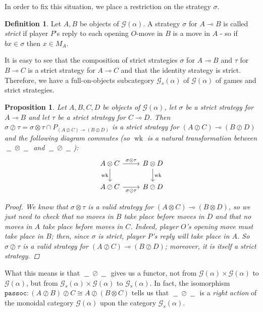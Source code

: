 \documentclass[11pt]{article} %
\theoremstyle{plain} %
\newtheorem{proposition}[theorem]{Proposition}
\theoremstyle{definition} %
\newtheorem{definition}[theorem]{Definition}
\theoremstyle{note}
\theoremstyle{exercisestyle}
\newcommand*\from{\colon}
\newcommand{\tensor}{\otimes}
\newcommand{\sequoid}{\oslash}
\renewcommand{\implies}{\multimap}
\newcommand{\G}{\mathcal G}
\newcommand{\blank}{\;\underline{\hspace{1.5ex}}\;}
\DeclareMathOperator{\wk}{wk}
\newcommand{\passoc}{{\texttt{passoc}}}
\begin{document}
In order to fix this situation, we place a restriction on the strategy $\sigma$.

\begin{definition}
  Let $A,B$ be objects of $\G(\alpha)$.  A strategy $\sigma$ for $A\implies B$ is called \emph{strict} if player $P$'s reply to each opening $O$-move in $B$ is a move in $A$ - so if $bx\in\sigma$ then $x\in M_A$.

  It is easy to see that the composition of strict strategies $\sigma$ for $A\implies B$ and $\tau$ for $B\implies C$ is a strict strategy for $A\implies C$ and that the identity strategy is strict.  Therefore, we have a full-on-objects subcategory $\G_s(\alpha)$ of $\G(\alpha)$ of games and strict strategies.
\end{definition}

\begin{proposition}
  Let $A,B,C,D$ be objects of $\G(\alpha)$, let $\sigma$ be a strict strategy for $A\implies B$ and let $\tau$ be a strict strategy for $C\implies D$.  Then $\sigma\sequoid\tau=\sigma\tensor\tau\cap P_{(A\sequoid C)\implies (B\sequoid D)}$ is a strict strategy for $(A\sequoid C)\implies (B\sequoid D)$ and the following diagram commutes (so $\wk$ is a natural transformation between $\blank\tensor\blank$ and $\blank\sequoid\blank$):
  \[
    \begin{tikzcd}
      A\tensor C \arrow[r, "\sigma\tensor\tau"] \arrow[d, "\wk"']
        & B\tensor D \arrow[d, "\wk"] \\
      A\sequoid C \arrow[r, "\sigma\sequoid\tau"']
        & B\sequoid D
    \end{tikzcd}
    \]

  \begin{proof}
    We know that $\sigma\tensor\tau$ is a valid strategy for $(A\tensor C)\implies (B\tensor D)$, so we just need to check that no moves in $B$ take place before moves in $D$ and that no moves in $A$ take place before moves in $C$.  Indeed, player $O$'s opening move must take place in $B$; then, since $\sigma$ is strict, player $P$'s reply will take place in $A$.  So $\sigma\sequoid\tau$ is a valid strategy for $(A\sequoid C)\implies(B\sequoid D)$; moreover, it is itself a strict strategy.
  \end{proof}
\end{proposition}

What this means is that $\blank\sequoid\blank$ gives us a functor, not from $\G(\alpha)\times\G(\alpha)$ to $\G(\alpha)$, but from $\G_s(\alpha)\times\G(\alpha)$ to $\G_s(\alpha)$.  In fact, the isomorphism $\passoc\from (A\sequoid B)\sequoid C\cong A\sequoid(B\tensor C)$ tells us that $\blank\sequoid\blank$ is a \emph{right action} of the monoidal category $\G(\alpha)$ upon the category $\G_s(\alpha)$.  
\end{document}
